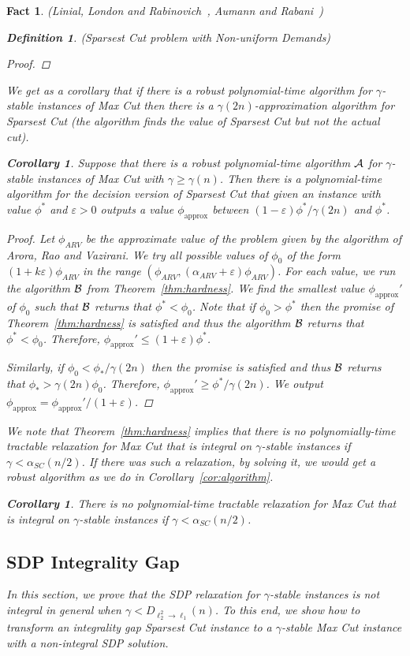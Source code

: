 \documentclass[twoside,leqno,twocolumn]{article}
\newtheorem{corollary}[theorem]{Corollary}
\newtheorem{Definition}[theorem]{Definition}
\newtheorem{fact}[theorem]{Fact}
\begin{document}
\begin{fact}{\sc (Linial, London and Rabinovich~\cite{LLR}, Aumann and Rabani~\cite{AR})}
\begin{Definition} {\sc (Sparsest Cut problem with Non-uniform Demands)}
\begin{proof}
\end{proof}

We get as a corollary that if there is a robust polynomial-time algorithm for $\gamma$-stable instances of Max Cut then there is a $\gamma(2n)$-approximation
algorithm for Sparsest Cut (the algorithm finds the value of Sparsest Cut but
not the actual cut). 
\begin{corollary}
Suppose that there is a robust polynomial-time algorithm $\cal A$ for $\gamma$-stable instances of Max Cut with $\gamma \geq \gamma(n)$.
Then there is a polynomial-time algorithm for the decision version of Sparsest Cut 
that given an instance with value $\phi^*$ and $\varepsilon > 0$
outputs a value $\phi_{\text{approx}}$ between $(1-\varepsilon)\phi^*/\gamma(2n)$ 
and $\phi^*$.
\end{corollary}
\begin{proof}
Let $\phi_{ARV}$ be the approximate value of the problem given by the algorithm of Arora, Rao and Vazirani. We try all possible values of $\phi_0$ of the form
$(1+k \varepsilon) \phi_{ARV}$ in the range $(\phi_{ARV},(\alpha_{ARV}+\varepsilon)\phi_{ARV})$. For each value, we
run the algorithm $\cal B$ from Theorem~\ref{thm:hardness}. We find the smallest value $\phi_{\text{approx}}'$ of $\phi_0$ such that $\cal B$ returns that $\phi^* < \phi_0$.
Note that if $\phi_0 > \phi^*$ then the promise of Theorem~\ref{thm:hardness} 
is satisfied and thus the algorithm $\cal B$ 
returns that $\phi^* < \phi_0$. Therefore, $\phi_{\text{approx}}' \leq (1+\varepsilon) \phi^*$. 

Similarly, if $\phi_0 < \phi_*/\gamma(2n)$ then the promise is satisfied and thus 
$\cal B$ returns that $\phi_* >  \gamma(2n) \phi_0$. Therefore, $\phi_{\text{approx}}'
\geq \phi^*/\gamma(2n)$. We output $\phi_{\text{approx}} = \phi_{\text{approx}}'/ (1+\varepsilon)$.
\end{proof}

We note that Theorem~\ref{thm:hardness} implies that there is no polynomially-time tractable relaxation
for Max Cut that is integral on $\gamma$-stable instances if
$\gamma < \alpha_{SC}(n/2)$. If there was such a relaxation, by solving it, 
we would get a robust algorithm as we do in Corollary~\ref{cor:algorithm}.
\begin{corollary}
There is no polynomial-time tractable relaxation for Max Cut that is integral on $\gamma$-stable instances if
$\gamma < \alpha_{SC}(n/2)$.
\end{corollary}

\subsection{SDP Integrality Gap} \label{sec:intgap}
In this section, we prove that the SDP relaxation for $\gamma$-stable instances is not integral in general when 
$\gamma <D_{\ell_2^2\to \ell_1}(n)$. To this end, we show how to transform an integrality gap Sparsest Cut instance 
to a $\gamma$-stable Max Cut instance with a non-integral SDP solution.


\end{Definition}
\end{fact}
\end{document}
